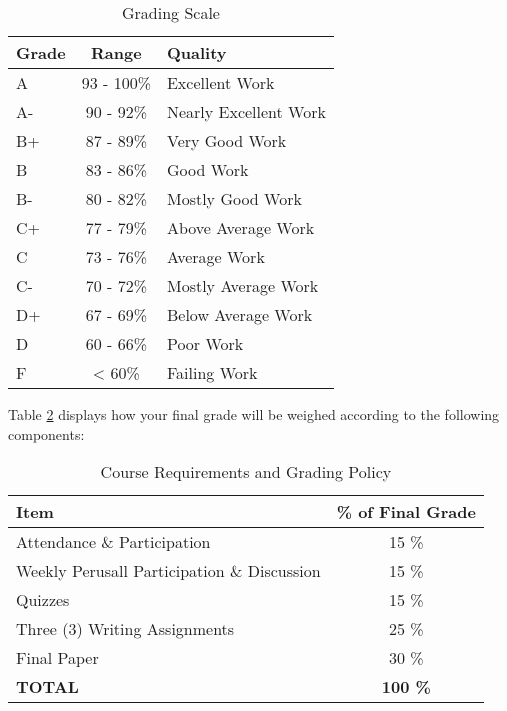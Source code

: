 \documentclass[11pt,]{article}
\begin{document}
\begin{table}[!h]

\caption{\label{tab:grade_scale}Grading Scale}
\centering
\fontsize{10}{12}\selectfont
\begin{tabular}[t]{l|c|l}
\hline
\textbf{Grade} & \textbf{Range} & \textbf{Quality}\\
\hline
A & 93 - 100\% & Excellent Work\\
\hline
A- & 90 - 92\% & Nearly Excellent Work\\
\hline
B+ & 87 - 89\% & Very Good Work\\
\hline
B & 83 - 86\% & Good Work\\
\hline
B- & 80 - 82\% & Mostly Good Work\\
\hline
C+ & 77 - 79\% & Above Average Work\\
\hline
C & 73 - 76\% & Average Work\\
\hline
C- & 70 - 72\% & Mostly Average Work\\
\hline
D+ & 67 - 69\% & Below Average Work\\
\hline
D & 60 - 66\% & Poor Work\\
\hline
F & < 60\% & Failing Work\\
\hline
\end{tabular}
\end{table}

Table \ref{tab:weight_table} displays how your final grade will be
weighed according to the following components:

\renewcommand{\arraystretch}{1.5}

\begin{table}[!h]

\caption{\label{tab:weight_table}Course Requirements and Grading Policy}
\centering
\fontsize{10}{12}\selectfont
\begin{tabular}[t]{lc}
\toprule
\textbf{Item} & \textbf{\% of Final Grade}\\
\midrule
Attendance \& Participation & 15 \%\\
Weekly Perusall Participation \& Discussion & 15 \%\\
Quizzes & 15 \%\\
Three (3) Writing Assignments & 25 \%\\
Final Paper & 30 \%\\
\addlinespace
\textbf{TOTAL} & \textbf{100 \%}\\
\midrule
\bottomrule
\end{tabular}
\end{table}
\end{document}
